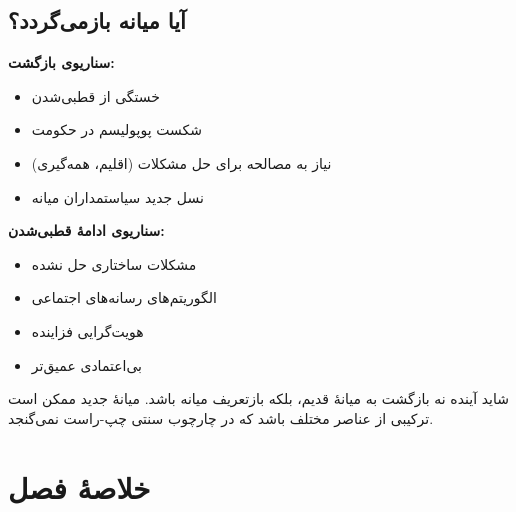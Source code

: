 \subsection{آیا میانه بازمی‌گردد؟}


\textbf{سناریوی بازگشت:}
\begin{itemize}
    \item خستگی از قطبی‌شدن
    \item شکست پوپولیسم در حکومت
    \item نیاز به مصالحه برای حل مشکلات (اقلیم، همه‌گیری)
    \item نسل جدید سیاستمداران میانه
\end{itemize}

\textbf{سناریوی ادامهٔ قطبی‌شدن:}
\begin{itemize}
    \item مشکلات ساختاری حل نشده
    \item الگوریتم‌های رسانه‌های اجتماعی
    \item هویت‌گرایی فزاینده
    \item بی‌اعتمادی عمیق‌تر
\end{itemize}

شاید آینده نه بازگشت به میانهٔ قدیم، بلکه بازتعریف میانه باشد. میانهٔ جدید ممکن است ترکیبی از عناصر مختلف باشد که در چارچوب سنتی چپ-راست نمی‌گنجد.


\section*{خلاصهٔ فصل}

